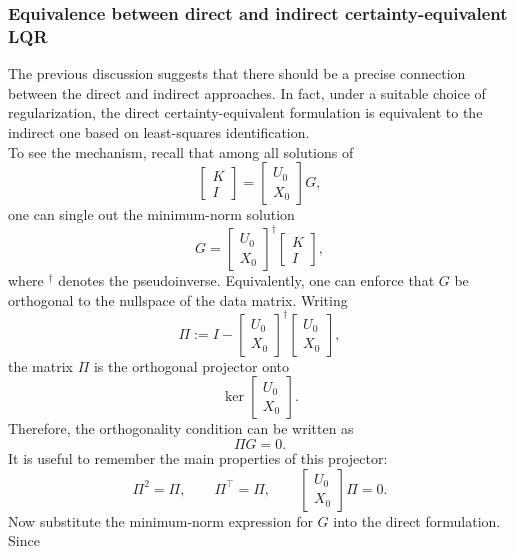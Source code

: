 \subsubsection{Equivalence between direct and indirect certainty-equivalent LQR}

The previous discussion suggests that there should be a precise connection between the direct
and indirect approaches. In fact, under a suitable choice of regularization, the direct
certainty-equivalent formulation is equivalent to the indirect one based on least-squares
identification.\\

To see the mechanism, recall that among all solutions of
\[
\begin{bmatrix}
K\\[0.3em]
I
\end{bmatrix}
=
\begin{bmatrix}
U_0\\[0.3em]
X_0
\end{bmatrix}G,
\]
one can single out the minimum-norm solution
\[
G =
\begin{bmatrix}
U_0\\[0.3em]
X_0
\end{bmatrix}^{\dagger}
\begin{bmatrix}
K\\[0.3em]
I
\end{bmatrix},
\]
where ${}^\dagger$ denotes the pseudoinverse. Equivalently, one can enforce
that $G$ be orthogonal to the nullspace of the data matrix. Writing
\[
\Pi := I -
\begin{bmatrix}
U_0\\[0.3em]
X_0
\end{bmatrix}^{\dagger}
\begin{bmatrix}
U_0\\[0.3em]
X_0
\end{bmatrix},
\]
the matrix $\Pi$ is the orthogonal projector onto
\[
\ker\!\begin{bmatrix}
U_0\\[0.3em]
X_0
\end{bmatrix}.
\]
Therefore, the orthogonality condition can be written as
\[
\Pi G = 0.
\]
It is useful to remember the main properties of this projector:
\[
\Pi^2 = \Pi,
\qquad
\Pi^\top = \Pi,
\qquad
\begin{bmatrix}
U_0\\[0.3em]
X_0
\end{bmatrix}\Pi = 0.
\]
Now substitute the minimum-norm expression for $G$ into the direct formulation. Since
